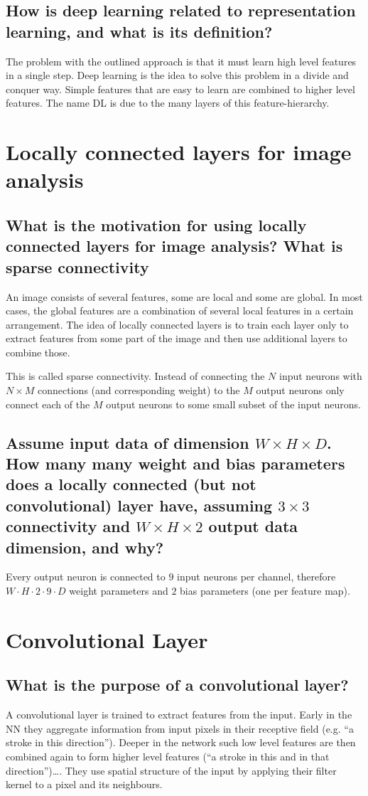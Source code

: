 \subsection{How is deep learning related to representation learning, and what is its definition?}
The problem with the outlined approach is that it must learn high level features in a single step. Deep learning is the idea to solve this problem in a divide and conquer way. 
Simple features that are easy to learn are combined to higher level features. The name DL is due to the many layers of this feature-hierarchy.
%
\section{Locally connected layers for image analysis}
\subsection{What is the motivation for using locally connected layers for image analysis? What is sparse connectivity}
An image consists of several features, some are local and some are global. In most cases, the global features are a combination of several local features in a certain arrangement.
The idea of locally connected layers is to train each layer only to extract features from some part of the image and then use additional layers to combine those. 

This is called sparse connectivity. Instead of connecting the $N$ input neurons with $N\times M$ connections (and corresponding weight) to the $M$ output neurons only connect each of the $M$ output neurons to some small subset of the input neurons. 
\subsection{Assume input data of dimension $W \times H \times D$. How many many weight and bias parameters does a locally connected (but not convolutional) layer have, assuming $3 \times 3$ connectivity and $W \times H \times 2$ output data dimension, and why?}
Every output neuron is connected to $9$ input neurons per channel, therefore $W\cdot H\cdot 2 \cdot 9 \cdot D$ weight parameters and $2$ bias parameters (one per feature map).
%
\section{Convolutional Layer}
\subsection{What is the purpose of a convolutional layer?}
A convolutional layer is trained to extract features from the input. Early in the NN they aggregate information from input pixels in their receptive field (e.g. ``a stroke in this direction''). Deeper in the network such low level features are then combined again to form higher level features (``a stroke in this and in that direction'')\ldots.
They use spatial structure of the input by applying their filter kernel to a pixel and its neighbours. 
